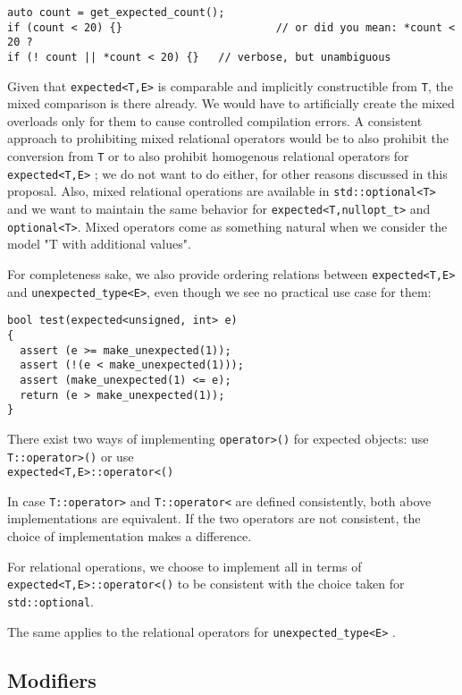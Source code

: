 \documentclass[a4paper,10pt]{article}
\newcommand{\cpp}[1]{\lstinline{#1}}
\begin{document}
\begin{lstlisting}
auto count = get_expected_count();
if (count < 20) {}                        // or did you mean: *count < 20 ?
if (! count || *count < 20) {}   // verbose, but unambiguous
\end{lstlisting}

Given that \cpp{expected<T,E>} is comparable and implicitly constructible from \cpp{T}, the mixed comparison is there already. We would have to artificially create the mixed overloads only for them to cause controlled compilation errors. A consistent approach to prohibiting mixed relational operators would be to also prohibit the conversion from \cpp{T} or to also prohibit homogenous relational operators for \cpp{expected<T,E>} ; we do not want to do either, for other reasons discussed in this proposal. Also, mixed relational operations are available in \cpp{std::optional<T>} and we want to maintain the same behavior for \cpp{expected<T,nullopt_t>} and \cpp{optional<T>}. Mixed operators come as something natural when we consider the model "T with additional values".

For completeness sake, we also provide ordering relations between  \cpp{expected<T,E>} and  \cpp{unexpected_type<E>}, even though we see no practical use case for them:

\begin{lstlisting}
bool test(expected<unsigned, int> e)
{
  assert (e >= make_unexpected(1));    
  assert (!(e < make_unexpected(1)));  
  assert (make_unexpected(1) <= e);    
  return (e > make_unexpected(1));     
}
\end{lstlisting}

There exist two ways of implementing \cpp{operator>()} for expected objects: use \cpp{T::operator>()} or use \\
 \cpp{expected<T,E>::operator<()}

In case \cpp{T::operator>} and \cpp{T::operator<} are defined consistently, both above implementations are equivalent. If the two operators are not consistent, the choice of implementation makes a difference. 

For relational operations, we choose to implement all in terms of  \cpp{expected<T,E>::operator<()} to be consistent with the choice taken for \cpp{std::optional}.

The same applies to the relational operators for \cpp{unexpected_type<E>} .

\subsection{Modifiers}
\end{document}
